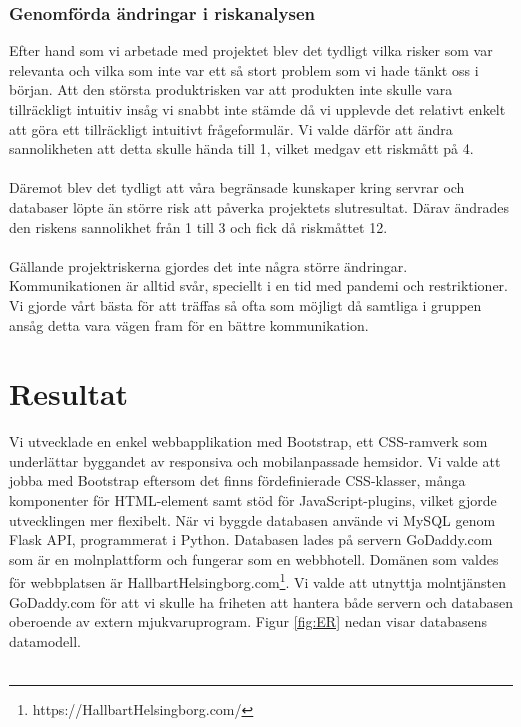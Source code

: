 \documentclass[12pt]{article}
\begin{document}
 \subsubsection{Genomförda ändringar i riskanalysen}Efter hand som vi arbetade med projektet blev det tydligt vilka risker som var relevanta och vilka som inte var ett så stort problem som vi hade tänkt oss i början. Att den största produktrisken var att produkten inte skulle vara tillräckligt intuitiv insåg vi snabbt inte stämde då vi upplevde det relativt enkelt att göra ett tillräckligt intuitivt frågeformulär. Vi valde därför att ändra sannolikheten att detta skulle hända till 1, vilket medgav ett riskmått på 4.\\\\
 Däremot blev det tydligt att våra begränsade kunskaper kring servrar och databaser löpte än större risk att påverka projektets slutresultat. Därav ändrades den riskens sannolikhet från 1 till 3 och fick då riskmåttet 12.\\\\
 Gällande projektriskerna gjordes det inte några större ändringar. Kommunikationen är alltid svår, speciellt i en tid med pandemi och restriktioner. Vi gjorde vårt bästa för att träffas så ofta som möjligt då samtliga i gruppen ansåg detta vara vägen fram för en bättre kommunikation. 
 

 



\section{Resultat}
Vi utvecklade en enkel webbapplikation med Bootstrap, ett CSS-ramverk som underlättar byggandet av responsiva och mobilanpassade hemsidor. Vi valde att jobba med Bootstrap eftersom det finns fördefinierade CSS-klasser, många komponenter för HTML-element samt stöd för JavaScript-plugins, vilket gjorde utvecklingen mer flexibelt. När vi byggde databasen använde vi MySQL genom Flask API, programmerat i Python. Databasen lades på servern GoDaddy.com som är en molnplattform och fungerar som en webbhotell. Domänen som valdes för webbplatsen är HallbartHelsingborg.com\footnote{https://HallbartHelsingborg.com/}. Vi valde att utnyttja molntjänsten GoDaddy.com för att vi skulle ha friheten att hantera både servern och databasen oberoende av extern mjukvaruprogram. Figur \ref{fig:ER} nedan visar databasens datamodell.\\\\
\end{document}
